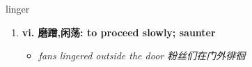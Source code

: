 
\begin{frame}
{\huge linger}
\begin{center}
\begin{enumerate}\Large
  \item \textbf{vi. 磨蹭,闲荡: to proceed slowly; saunter}
  \begin{itemize}
    \item \em{\Large{fans lingered outside the door 粉丝们在门外徘徊}}
  \end{itemize}
\end{enumerate}
\end{center}
\end{frame}
